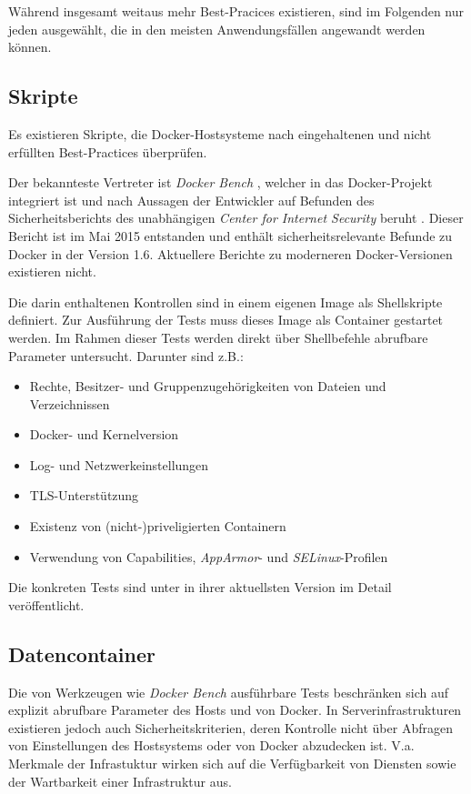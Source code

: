 \documentclass[../main.tex]{subfiles}
\begin{document}
    Während insgesamt weitaus mehr Best-Pracices existieren, sind im Folgenden nur jeden ausgewählt, die in den meisten Anwendungsfällen angewandt werden können.

    \subsection{Skripte}
      Es existieren Skripte, die Docker-Hostsysteme nach eingehaltenen und nicht erfüllten Best-Practices überprüfen.

      Der bekannteste Vertreter ist \emph{Docker Bench} \cite{githubDockerBench}, welcher in das Docker-Projekt integriert ist und nach Aussagen der Entwickler auf Befunden des Sicherheitsberichts des unabhängigen \emph{Center for Internet Security} beruht \cite{dockerBenchmarkCIS}. Dieser Bericht ist im Mai 2015 entstanden und enthält sicherheitsrelevante Befunde zu Docker in der Version 1.6. Aktuellere Berichte zu moderneren Docker-Versionen existieren nicht.

      Die darin enthaltenen Kontrollen sind in einem eigenen Image als Shellskripte definiert. Zur Ausführung der Tests muss dieses Image als Container gestartet werden. Im Rahmen dieser Tests werden direkt über Shellbefehle abrufbare Parameter untersucht. Darunter sind z.B.:

      \begin{itemize}
        \item Rechte, Besitzer- und Gruppenzugehörigkeiten von Dateien und Verzeichnissen
        \item Docker- und Kernelversion
        \item Log- und Netzwerkeinstellungen
        \item TLS-Unterstützung
        \item Existenz von (nicht-)priveligierten Containern
        \item Verwendung von Capabilities, \emph{AppArmor}- und \emph{SELinux}-Profilen
      \end{itemize}

      Die konkreten Tests sind unter \cite{githubDockerBenchTests} in ihrer aktuellsten Version im Detail veröffentlicht.

    \subsection{Datencontainer}
      Die von Werkzeugen wie \emph{Docker Bench} ausführbare Tests beschränken sich auf explizit abrufbare Parameter des Hosts und von Docker. In Serverinfrastrukturen existieren jedoch auch Sicherheitskriterien, deren Kontrolle nicht über Abfragen von Einstellungen des Hostsystems oder von Docker abzudecken ist. V.a. Merkmale der Infrastuktur wirken sich auf die Verfügbarkeit von Diensten sowie der Wartbarkeit einer Infrastruktur aus.
\end{document}

